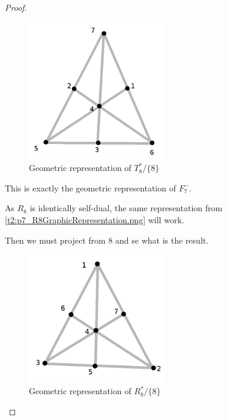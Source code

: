 \begin{proof}
\begin{enumerate}[label=(\roman*)]
            \begin{figure}[H]
                \begin{center}
                    \includegraphics[width=6cm]{Test2/Problem7/T8DualMinorGraphicRepresentation.png}
                \end{center}                            
                \caption{Geometric representation of $T_8^* / \{8\}$}
                \label{t2:p7_T8DualMinorGraphicRepresentation.png}                        
            \end{figure}\pn 
            
            This is exactly the geometric representation of $F_7^-$.
            
            As $R_8$ is identically self-dual, the same representation from \ref{t2:p7_R8GraphicRepresentation.png} will work.\pn
            
            Then we must project from $8$ and se what is the result.
             \begin{figure}[H]
                \begin{center}
                    \includegraphics[width=6cm]{Test2/Problem7/R8DualMinorGraphicRepresentation.png}
                \end{center}                            
                \caption{Geometric representation of $R_8^* / \{8\}$}
                \label{t2:p7_R8DualMinorGraphicRepresentation.png}                        
            \end{figure}\pn 
            

\end{enumerate}
\end{proof}
